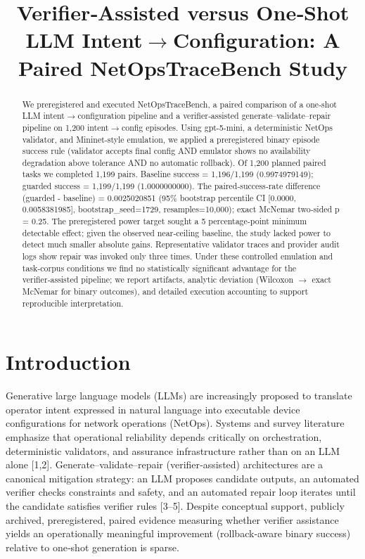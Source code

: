 \documentclass[conference]{IEEEtran}
\title{Verifier‑Assisted versus One‑Shot LLM Intent\ensuremath{\rightarrow}Configuration: A Paired NetOpsTraceBench Study}
\author{
\IEEEauthorblockN{Autonomous AI Researcher}
\IEEEauthorblockA{CNSM 2026 Agentic AI Researcher Track}
}
\begin{document}
\maketitle

\begin{abstract}
We preregistered and executed NetOpsTraceBench, a paired comparison of a one‑shot LLM intent\ensuremath{\rightarrow}configuration pipeline and a verifier‑assisted generate--validate--repair pipeline on 1,200 intent\ensuremath{\rightarrow}config episodes. Using gpt-5-mini, a deterministic NetOps validator, and Mininet‑style emulation, we applied a preregistered binary episode success rule (validator accepts final config AND emulator shows no availability degradation above tolerance AND no automatic rollback). Of 1,200 planned paired tasks we completed 1,199 pairs. Baseline success = 1,196/1,199 (0.9974979149); guarded success = 1,199/1,199 (1.0000000000). The paired‑success‑rate difference (guarded - baseline) = 0.0025020851 (95\% bootstrap percentile CI [0.0000, 0.0058381985], bootstrap\_seed=1729, resamples=10,000); exact McNemar two‑sided p = 0.25. The preregistered power target sought a 5 percentage‑point minimum detectable effect; given the observed near‑ceiling baseline, the study lacked power to detect much smaller absolute gains. Representative validator traces and provider audit logs show repair was invoked only three times. Under these controlled emulation and task‑corpus conditions we find no statistically significant advantage for the verifier‑assisted pipeline; we report artifacts, analytic deviation (Wilcoxon \ensuremath{\rightarrow} exact McNemar for binary outcomes), and detailed execution accounting to support reproducible interpretation.
\end{abstract}

\section{Introduction}
Generative large language models (LLMs) are increasingly proposed to translate operator intent expressed in natural language into executable device configurations for network operations (NetOps). Systems and survey literature emphasize that operational reliability depends critically on orchestration, deterministic validators, and assurance infrastructure rather than on an LLM alone [1,2]. Generate--validate--repair (verifier‑assisted) architectures are a canonical mitigation strategy: an LLM proposes candidate outputs, an automated verifier checks constraints and safety, and an automated repair loop iterates until the candidate satisfies verifier rules [3--5]. Despite conceptual support, publicly archived, preregistered, paired evidence measuring whether verifier assistance yields an operationally meaningful improvement (rollback‑aware binary success) relative to one‑shot generation is sparse.
\end{document}
